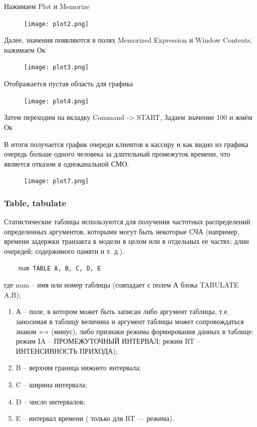 \documentclass[14pt]{extarticle}
\begin{document}
Нажимаем Plot и Memorize

\begin{figure}[h!]
    \centering
    \texttt{[image: plot2.png]}
\end{figure}

Далее, значения появляются в полях Memorized Expression и Window Contents, нажимаем Ок

\begin{figure}[h!]
    \centering
    \texttt{[image: plot3.png]}
\end{figure}

\newpage

Отображается пустая область для графика

\begin{figure}[h!]
    \centering
    \texttt{[image: plot4.png]}
\end{figure}

Затем переходим на вкладку Command -> START, Задаем значение 100 и жмём Ок



В итоги получается график очереди клиентов к кассиру и как видно из графика очередь больше одного человека за длительный промежуток времени, что является отказом в одноканальной СМО.

\begin{figure}[h!]
    \centering
    \texttt{[image: plot7.png]}
\end{figure}

\subsubsection*{Table, tabulate}

Статистические таблицы используются для получения частотных распределений определенных аргументов, которыми могут быть некоторые СЧА (например, времени задержки транзакта в модели в целом или в отдельных ее частях; длин очередей; содержимого памяти и т. д.).

\begin{lstlisting}
	num TABLE A, B, C, D, E
\end{lstlisting}

где num – имя или номер таблицы (совпадает с полем А блока TABULATE A,B);

\begin{enumerate}
	\item А – поле, в котором может быть записан либо аргумент таблицы, т.е. заносимая в таблицу величина и аргумент таблицы может сопровождаться знаком «-» (минус), либо признаки режима формирования данных в таблице: режим IA – ПРОМЕЖУТОЧНЫЙ ИНТЕРВАЛ; режим RT – ИНТЕНСИВНОСТЬ ПРИХОДА);
	\item B – верхняя граница нижнего интервала;
	\item C – ширина интервала;
	\item D – число интервалов;
	\item E – интервал времени ( только для RT — режима).
\end{enumerate}
\end{document}

